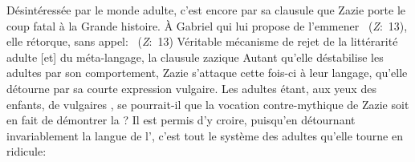 Désintéressée par le monde adulte, c'est encore par sa clausule que Zazie porte le coup fatal à la Grande histoire. À Gabriel qui lui propose de l'emmener ~(\textit{Z}:~13), elle rétorque, sans appel: ~(\textit{Z}:~13)
Véritable mécanisme de rejet de la littérarité adulte [et] du méta-langage, la clausule zazique 
Autant qu'elle déstabilise les adultes par son comportement, Zazie s'attaque cette fois-ci à leur langage, qu'elle détourne par sa courte expression vulgaire.
Les adultes étant, aux yeux des enfants, de vulgaires , se pourrait-il que la vocation contre-mythique de Zazie soit en fait de démontrer la ?
Il est permis d'y croire, puisqu'en détournant invariablement la langue de l', c'est tout le système des adultes qu'elle tourne en ridicule: 


